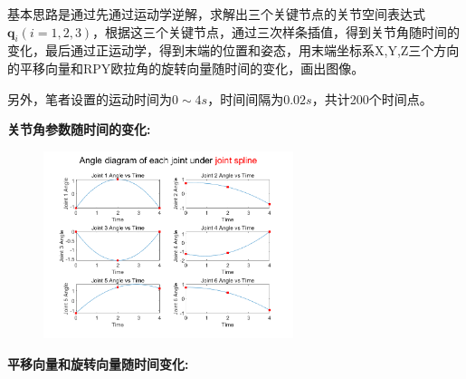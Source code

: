 \documentclass{ctexart}
\begin{document}
基本思路是通过先通过运动学逆解，求解出三个关键节点的关节空间表达式$\boldsymbol{q}_i(i=1,2,3)$，根据这三个关键节点，通过三次样条插值，得到关节角随时间的变化，最后通过正运动学，得到末端的位置和姿态，用末端坐标系X,Y,Z三个方向的平移向量和RPY欧拉角的旋转向量随时间的变化，画出图像。

另外，笔者设置的运动时间为\textbf{$0\sim 4s$}，时间间隔为$0.02s$，共计200个时间点。

\textbf{\textcolor{cherry}{关节角参数随时间的变化:}}
\begin{figure}[h]
	\centering
	\includegraphics[width=0.65\textwidth]{Image/angle_spline_diagram.png}
\end{figure}

\textbf{\textcolor{cherry}{平移向量和旋转向量随时间变化:}}
\begin{figure}[h]
	\centering
\end{figure}
\end{document}
